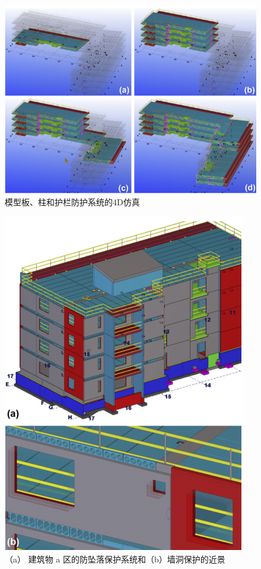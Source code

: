 \begin{figure}[thbp!]
    \centering
    \includegraphics[width=0.8\linewidth]{res/c4f11.png}
    \caption{模型板、柱和护栏防护系统的4D仿真}
    \label{fig:c4f11}
\end{figure}
\newpage
\begin{figure}[thbp!]
    \centering
    \includegraphics[width=1\linewidth]{res/c4f12.png}
    \caption{（a） 建筑物 a 区的防坠落保护系统和（b）墙洞保护的近景}
    \label{fig:c4f12}
\end{figure}

